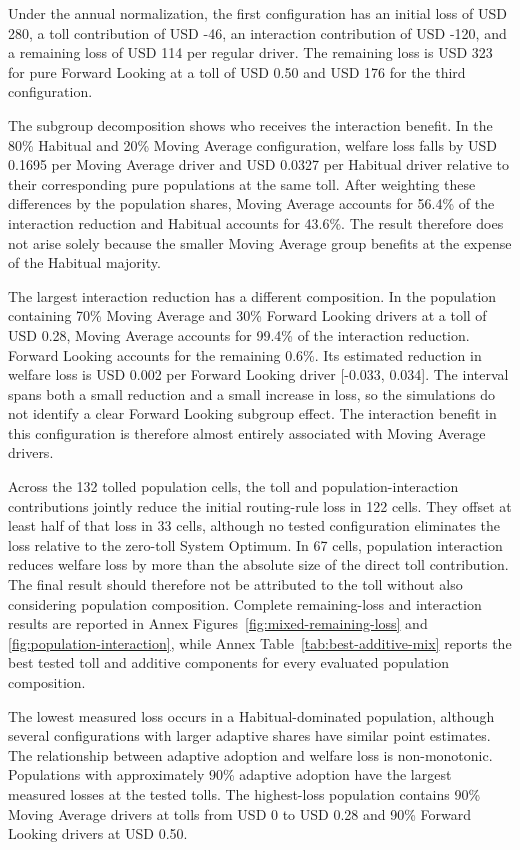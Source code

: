 \documentclass{article}
\begin{document}
Under the annual normalization, the first configuration has an initial loss of USD 280, a toll contribution of USD -46, an interaction contribution of USD -120, and a remaining loss of USD 114 per regular driver. The remaining loss is USD 323 for pure Forward Looking at a toll of USD 0.50 and USD 176 for the third configuration.

The subgroup decomposition shows who receives the interaction benefit. In the 80\% Habitual and 20\% Moving Average configuration, welfare loss falls by USD 0.1695 per Moving Average driver and USD 0.0327 per Habitual driver relative to their corresponding pure populations at the same toll. After weighting these differences by the population shares, Moving Average accounts for 56.4\% of the interaction reduction and Habitual accounts for 43.6\%. The result therefore does not arise solely because the smaller Moving Average group benefits at the expense of the Habitual majority.

The largest interaction reduction has a different composition. In the population containing 70\% Moving Average and 30\% Forward Looking drivers at a toll of USD 0.28, Moving Average accounts for 99.4\% of the interaction reduction. Forward Looking accounts for the remaining 0.6\%. Its estimated reduction in welfare loss is USD 0.002 per Forward Looking driver [-0.033, 0.034]. The interval spans both a small reduction and a small increase in loss, so the simulations do not identify a clear Forward Looking subgroup effect. The interaction benefit in this configuration is therefore almost entirely associated with Moving Average drivers.

Across the 132 tolled population cells, the toll and population-interaction contributions jointly reduce the initial routing-rule loss in 122 cells. They offset at least half of that loss in 33 cells, although no tested configuration eliminates the loss relative to the zero-toll System Optimum. In 67 cells, population interaction reduces welfare loss by more than the absolute size of the direct toll contribution. The final result should therefore not be attributed to the toll without also considering population composition. Complete remaining-loss and interaction results are reported in Annex Figures~\ref{fig:mixed-remaining-loss} and \ref{fig:population-interaction}, while Annex Table~\ref{tab:best-additive-mix} reports the best tested toll and additive components for every evaluated population composition.

The lowest measured loss occurs in a Habitual-dominated population, although several configurations with larger adaptive shares have similar point estimates. The relationship between adaptive adoption and welfare loss is non-monotonic. Populations with approximately 90\% adaptive adoption have the largest measured losses at the tested tolls. The highest-loss population contains 90\% Moving Average drivers at tolls from USD 0 to USD 0.28 and 90\% Forward Looking drivers at USD 0.50.
\end{document}
